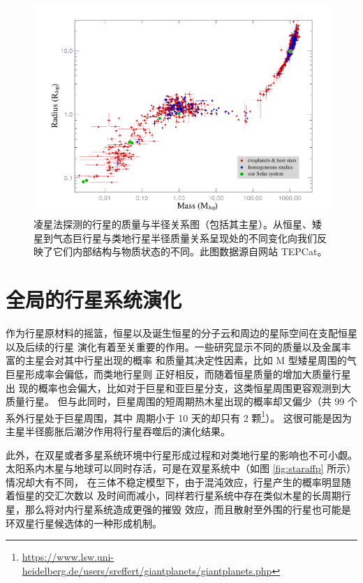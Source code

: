 \begin{figure}[t]
\centering
\includegraphics[width=1.0\textwidth]{figures/chapter5/fig2_massrad.pdf}
\caption{凌星法探测的行星的质量与半径关系图（包括其主星）。从恒星、矮星到气态巨行星与类地行星半径质量关系呈现处的不同变化向我们反映了它们内部结构与物质状态的不同。此图数据源自网站 TEPCat。}
\label{fig:massrad}
\end{figure}
 

\section{全局的行星系统演化} \label{sec:fateofplanets}

作为行星原材料的摇篮，恒星以及诞生恒星的分子云和周边的星际空间在支配恒星以及后续的行星
演化有着至关重要的作用。一些研究显示不同的质量以及金属丰富的主星会对其中行星出现的概率
和质量其决定性因素\cite{Fischer2005}，比如 M 型矮星周围的气巨星形成率会偏低，而类地行星则
正好相反\cite{Johnson2007b,Cumming2008,Kennedy2008}，而随着恒星质量的增加大质量行星出
现的概率也会偏大，比如对于巨星和亚巨星分支，这类恒星周围更容观测到大质量行星\cite{Johnson2007}。
但与此同时，巨星周围的短周期热木星出现的概率却又偏少（共 99 个系外行星处于巨星周围，其中
周期小于 10 天的却只有 2 颗\footnote{\url{https://www.lsw.uni-heidelberg.de/users/sreffert/giantplanets/giantplanets.php}}）。
这很可能是因为主星半径膨胀后潮汐作用将行星吞噬后的演化结果\cite{Sato2008,LilloBox2016}。


此外，在双星或者多星系统环境中行星形成过程和对类地行星的影响也不可小觑\cite{Desidera2007}。
太阳系内木星与地球可以同时存活，可是在双星系统中（如图 \ref{fig:staraffp} 所示）情况却大有不同，
在三体不稳定模型下\cite{Marzari2007}，由于混沌效应，行星产生的概率明显随着恒星的交汇次数以
及时间而减小，同样若行星系统中存在类似木星的长周期行星，那么将对内行星系统造成更强的摧毁
效应，而且散射至外围的行星也可能是环双星行星候选体的一种形成机制\cite{Gong2013}。


